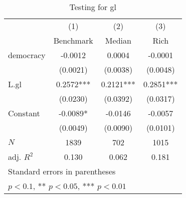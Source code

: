 \begin{table}[htbp]\centering
\def\sym#1{\ifmmode^{#1}\else\(^{#1}\)\fi}
\caption{Testing for gl \label{tab:regression6}}
\begin{tabular}{l*{3}{c}}
\hline\hline
            &\multicolumn{1}{c}{(1)}&\multicolumn{1}{c}{(2)}&\multicolumn{1}{c}{(3)}\\
            &\multicolumn{1}{c}{Benchmark}&\multicolumn{1}{c}{Median}&\multicolumn{1}{c}{Rich}\\
\hline
democracy   &     -0.0012   &      0.0004   &     -0.0001   \\
            &    (0.0021)   &    (0.0038)   &    (0.0048)   \\
[1em]
L.gl        &      0.2572***&      0.2121***&      0.2851***\\
            &    (0.0230)   &    (0.0392)   &    (0.0317)   \\
[1em]
Constant    &     -0.0089*  &     -0.0146   &     -0.0057   \\
            &    (0.0049)   &    (0.0090)   &    (0.0101)   \\
\hline
\(N\)       &        1839   &         702   &        1015   \\
adj. \(R^{2}\)&       0.130   &       0.062   &       0.181   \\
\hline\hline
\multicolumn{4}{l}{\footnotesize Standard errors in parentheses}\\
\multicolumn{4}{l}{\footnotesize * \(p<0.1\), ** \(p<0.05\), *** \(p<0.01\)}\\
\end{tabular}
\end{table}
